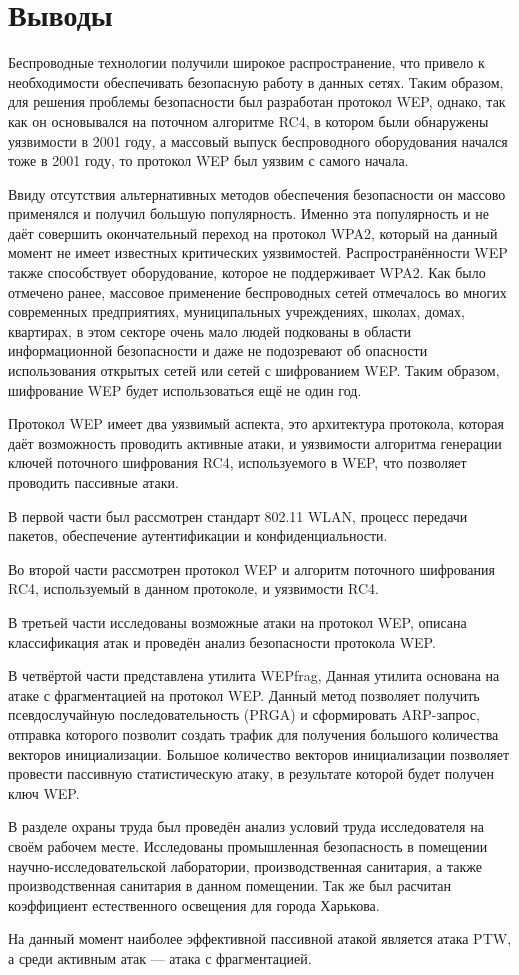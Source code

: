 \chapter*{Выводы}

Беспроводные технологии получили широкое распространение, что привело к
необходимости обеспечивать безопасную работу в данных сетях. Таким образом, для
решения проблемы безопасности был разработан протокол WEP, однако, так как он
основывался на поточном алгоритме RC4, в котором были обнаружены уязвимости в
2001 году, а массовый выпуск беспроводного оборудования начался тоже в 2001
году, то протокол WEP был уязвим с самого начала.

Ввиду отсутствия альтернативных методов обеспечения безопасности он массово
применялся и получил большую популярность. Именно эта популярность и не даёт
совершить окончательный переход на протокол WPA2, который на данный момент не
имеет известных критических уязвимостей. Распространённости WEP также
способствует оборудование, которое не поддерживает WPA2. Как было отмечено
ранее, массовое применение беспроводных сетей отмечалось во многих современных
предприятиях, муниципальных учреждениях, школах, домах, квартирах, в этом
секторе очень мало людей подкованы в области информационной безопасности и даже
не подозревают об опасности использования открытых сетей или сетей с шифрованием
WEP. Таким образом, шифрование WEP будет использоваться ещё не один год.

Протокол WEP имеет два уязвимый аспекта, это архитектура протокола, которая даёт
возможность проводить активные атаки, и уязвимости алгоритма генерации ключей
поточного шифрования RC4, используемого в WEP, что позволяет проводить пассивные
атаки.

В первой части был рассмотрен стандарт 802.11 WLAN, процесс передачи пакетов,
обеспечение аутентификации и конфиденциальности.

Во второй части рассмотрен протокол WEP и алгоритм поточного шифрования RC4,
используемый в данном протоколе, и уязвимости RC4.

В третьей части исследованы возможные атаки на протокол WEP, описана
классификация атак и проведён анализ безопасности протокола WEP.

В четвёртой части представлена утилита WEPfrag, Данная утилита основана на атаке
с фрагментацией на протокол WEP. Данный метод позволяет получить псевдослучайную
последовательность (PRGA) и сформировать ARP-запрос, отправка которого позволит
создать трафик для получения большого количества векторов инициализации.
Большое количество векторов инициализации позволяет провести пассивную
статистическую атаку, в результате которой будет получен ключ WEP.

В разделе охраны труда был проведён анализ условий труда исследователя на своём
рабочем месте. Исследованы промышленная безопасность в помещении
научно-исследовательской лаборатории, производственная санитария, а также
производственная санитария в данном помещении. Так же был расчитан коэффициент
естественного освещения для города Харькова.

На данный момент наиболее эффективной пассивной атакой является атака PTW, а
среди активным атак --- атака с фрагментацией.
